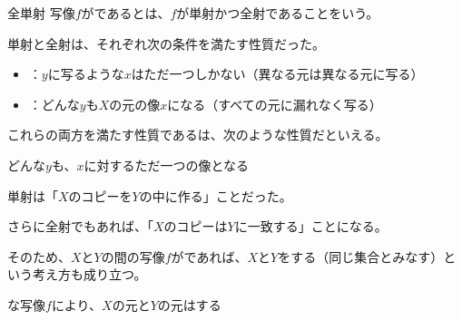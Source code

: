 \documentclass[../../../topic_linear-algebra]{subfiles}
\begin{document}
\begin{mindflow}
\end{mindflow}

\begin{definition*}{全単射}
  写像$f$がであるとは、$f$が単射かつ全射であることをいう。
\end{definition*}

単射と全射は、それぞれ次の条件を満たす性質だった。
\begin{itemize}
  \item {}：$y$に写るような$x$はただ一つしかない（異なる元は異なる元に写る）
  \item {}：どんな$y$も$X$の元の像$x$になる（すべての元に漏れなく写る）
\end{itemize}

これらの両方を満たす性質であるは、次のような性質だといえる。
\begin{emphabox}
  \begin{spacebox}
    \begin{center}
      どんな$y$も、$x$に対するただ一つの像となる
    \end{center}
  \end{spacebox}
\end{emphabox}

単射は「$X$のコピーを$Y$の中に作る」ことだった。

さらに全射でもあれば、「$X$のコピーは$Y$に一致する」ことになる。

\br

そのため、$X$と$Y$の間の写像$f$がであれば、$X$と$Y$をする（同じ集合とみなす）という考え方も成り立つ。

\begin{emphabox}
  \begin{spacebox}
    \begin{center}
      な写像$f$により、$X$の元と$Y$の元はする
    \end{center}
  \end{spacebox}
\end{emphabox}
\end{document}
